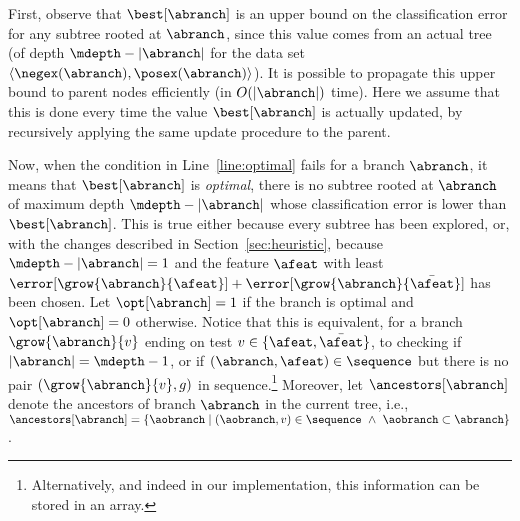 \documentclass{llncs}
\begin{document}




First, observe that $\best[\abranch]$ is an upper bound on the classification error for any subtree rooted at $\abranch$, since this value comes from an actual tree (of depth $\mdepth - |\abranch|$ for the data set $\langle \negex(\abranch),\posex(\abranch) \rangle$). It is possible to propagate this upper bound to parent nodes efficiently (in $O(|\abranch|)$ time). Here we assume that this is done every time the value $\best[\abranch]$ is actually updated, by recursively applying the same update procedure to the parent.


Now, when the condition in Line~\ref{line:optimal} fails for a branch $\abranch$, it means that $\best[\abranch]$ is \emph{optimal}, there is no subtree rooted at $\abranch$ of maximum depth $\mdepth - |\abranch|$ whose classification error is lower than $\best[\abranch]$. This is true either because every subtree has been explored, or, with the changes described in Section~\ref{sec:heuristic}, because $\mdepth - |\abranch| = 1$ and the feature $\afeat$ with least 
$\error[\grow{\abranch}{\afeat}] + \error[\grow{\abranch}{\bar{\afeat}}]$
has been chosen. 
Let $\opt[\abranch]=1$ if the branch is optimal and $\opt[\abranch]=0$ otherwise. Notice that this is equivalent, for a branch $\grow{\abranch}{v}$ ending on test $v \in \{\afeat,\bar{\afeat}\}$, to checking if $|\abranch|=\mdepth-1$, or if $(\abranch,\afeat) \in \sequence$ but there is no pair $(\grow{\abranch}{v}, g)$ in sequence.\footnote{Alternatively, and indeed in our implementation, this information can be stored in an array.}
Moreover, let $\ancestors[\abranch]$ denote the ancestors of branch $\abranch$ in the current tree, i.e., $\ancestors[\abranch] = \{\aobranch \mid (\aobranch,v) \in \sequence ~\wedge~ \aobranch \subset \abranch\}$.


\end{document}
